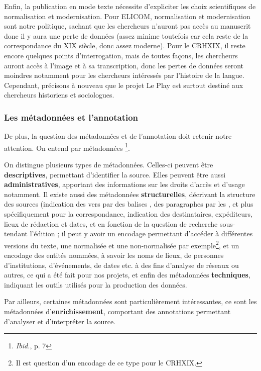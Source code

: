 Enfin, la publication en mode texte nécessite d'expliciter les choix scientifiques de normalisation et modernisation. 
Pour ELICOM, normalisation et modernisation sont notre politique, sachant que les chercheurs n'auront pas accès au manuscrit donc il y aura une perte de données (assez minime toutefois car cela reste de la correspondance du XIX siècle, donc assez moderne). Pour le CRHXIX, il reste encore quelques points d'interrogation, mais de toutes façons, les chercheurs auront accès à l'image et à sa transcription, donc les pertes de données seront moindres notamment pour les chercheurs intéressés par l'histoire de la langue. Cependant, précisons à nouveau que le projet Le Play est surtout destiné aux chercheurs historiens et sociologues.

\subsubsection{Les métadonnées et l'annotation}
De plus, la question des métadonnées et de l'annotation doit retenir notre attention. On entend par métadonnées \footnote{\emph{Ibid.}, p. 7}. 

On distingue plusieurs types de métadonnées. Celles-ci peuvent être \textbf{descriptives}, permettant d'identifier la source. Elles peuvent être aussi \textbf{administratives}, apportant des informations sur les droits d'accès et d'usage notamment. Il existe aussi des métadonnées \textbf{structurelles}, décrivant la structure des sources (indication des vers par des balises , des paragraphes par les , et plus spécifiquement pour la correspondance, indication des destinataires, expéditeurs, lieux de rédaction et dates, et en fonction de la question de recherche sous-tendant l'édition ; il peut y avoir un encodage permettant d'accéder à différentes versions du texte, une normalisée et une non-normalisée par exemple\footnote{Il est question d'un encodage de ce type pour le CRHXIX.}, et un encodage des entités nommées, à savoir les noms de lieux, de personnes d'institutions, d'événements, de dates etc. à des fins d'analyse de réseaux ou autres, ce qui a été fait pour nos projets, et enfin des métadonnées \textbf{techniques}, indiquant les outils utilisés pour la production des données. 

Par ailleurs, certaines métadonnées sont particulièrement intéressantes, ce sont les métadonnées d'\textbf{enrichissement}, comportant des annotations permettant d'analyser et d'interpréter la source.

